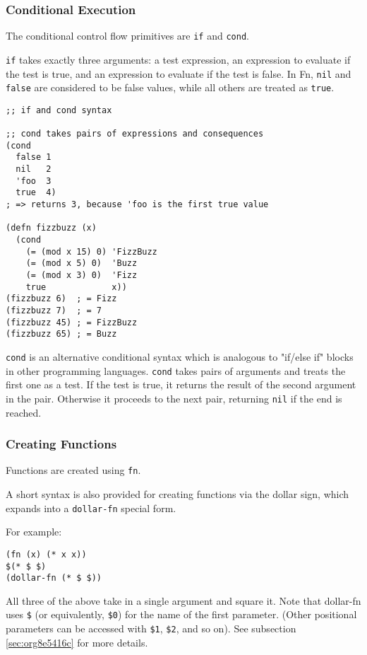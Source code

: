 \documentclass[11pt]{article}
\begin{document}
\subsubsection{Conditional Execution}
\label{sec:orgb1b9cca}

The conditional control flow primitives are \texttt{if} and \texttt{cond}.

\texttt{if} takes exactly three arguments: a test expression, an expression to evaluate
if the test is true, and an expression to evaluate if the test is false. In Fn,
\texttt{nil} and \texttt{false} are considered to be false values, while all others are treated as
\texttt{true}.
\begin{verbatim}
;; if and cond syntax

;; cond takes pairs of expressions and consequences
(cond
  false 1
  nil   2
  'foo  3
  true  4)
; => returns 3, because 'foo is the first true value

(defn fizzbuzz (x)
  (cond
    (= (mod x 15) 0) 'FizzBuzz
    (= (mod x 5) 0)  'Buzz
    (= (mod x 3) 0)  'Fizz
    true             x))
(fizzbuzz 6)  ; = Fizz
(fizzbuzz 7)  ; = 7
(fizzbuzz 45) ; = FizzBuzz
(fizzbuzz 65) ; = Buzz
\end{verbatim}

\texttt{cond} is an alternative conditional syntax which is analogous to "if/else if"
blocks in other programming languages. \texttt{cond} takes pairs of arguments and treats
the first one as a test. If the test is true, it returns the result of the
second argument in the pair. Otherwise it proceeds to the next pair, returning
\texttt{nil} if the end is reached.


\subsubsection{Creating Functions}
\label{sec:orgd6347d1}

Functions are created using \texttt{fn}.

A short syntax is also provided for creating functions via the dollar sign,
which expands into a \texttt{dollar-fn} special form.

For example:
\begin{verbatim}
(fn (x) (* x x))
$(* $ $)
(dollar-fn (* $ $))
\end{verbatim}

All three of the above take in a single argument and square it. Note that
dollar-fn uses \texttt{\$} (or equivalently, \texttt{\$0}) for the name of the first parameter.
(Other positional parameters can be accessed with \texttt{\$1}, \texttt{\$2}, and so on). See
subsection \ref{sec:org8e5416c} for more details.
\end{document}
